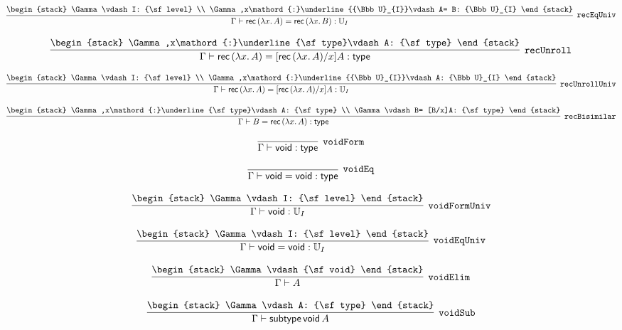 \[
\infer[{\tt recEqUniv}]{\Gamma \vdash {\sf rec}\,(\lambda x.\,A)= {\sf rec}\,(\lambda x.\,B): {\Bbb U}_{I}}{
\begin{stack}
\Gamma \vdash I: {\sf level}
\\
\Gamma ,x\mathord{:}\underline{{\Bbb U}_{I}}\vdash A= B: {\Bbb U}_{I}
\end{stack}}
\]

\[
\infer[{\tt recUnroll}]{\Gamma \vdash {\sf rec}\,(\lambda x.\,A)= [{\sf rec}\,(\lambda x.\,A)/x]A: {\sf type}}{
\begin{stack}
\Gamma ,x\mathord{:}\underline{\sf type}\vdash A: {\sf type}
\end{stack}}
\]

\[
\infer[{\tt recUnrollUniv}]{\Gamma \vdash {\sf rec}\,(\lambda x.\,A)= [{\sf rec}\,(\lambda x.\,A)/x]A: {\Bbb U}_{I}}{
\begin{stack}
\Gamma \vdash I: {\sf level}
\\
\Gamma ,x\mathord{:}\underline{{\Bbb U}_{I}}\vdash A: {\Bbb U}_{I}
\end{stack}}
\]

\[
\infer[{\tt recBisimilar}]{\Gamma \vdash B= {\sf rec}\,(\lambda x.\,A): {\sf type}}{
\begin{stack}
\Gamma ,x\mathord{:}\underline{\sf type}\vdash A: {\sf type}
\\
\Gamma \vdash B= [B/x]A: {\sf type}
\end{stack}}
\]

\[
\infer[{\tt voidForm}]{\Gamma \vdash {\sf void}: {\sf type}}{}
\]

\[
\infer[{\tt voidEq}]{\Gamma \vdash {\sf void}= {\sf void}: {\sf type}}{}
\]

\[
\infer[{\tt voidFormUniv}]{\Gamma \vdash {\sf void}: {\Bbb U}_{I}}{
\begin{stack}
\Gamma \vdash I: {\sf level}
\end{stack}}
\]

\[
\infer[{\tt voidEqUniv}]{\Gamma \vdash {\sf void}= {\sf void}: {\Bbb U}_{I}}{
\begin{stack}
\Gamma \vdash I: {\sf level}
\end{stack}}
\]

\[
\infer[{\tt voidElim}]{\Gamma \vdash A}{
\begin{stack}
\Gamma \vdash {\sf void}
\end{stack}}
\]

\[
\infer[{\tt voidSub}]{\Gamma \vdash {\sf subtype}\,{\sf void}\,A}{
\begin{stack}
\Gamma \vdash A: {\sf type}
\end{stack}}
\]

